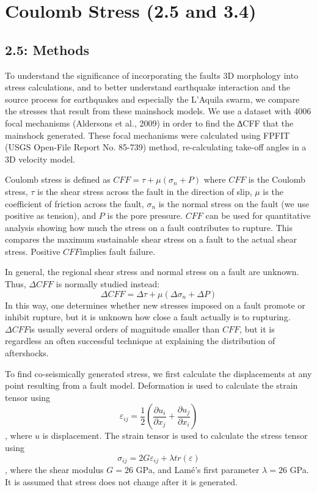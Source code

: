 \documentclass[11pt]{article}
\begin{document}
    \section{Coulomb Stress (2.5 and 3.4)}\label{coulomb-stress-2.5-and-3.4}

    \subsection{2.5: Methods}\label{methods}

    To understand the significance of incorporating the faults 3D morphology
into stress calculations, and to better understand earthquake
interaction and the source process for earthquakes and especially the
L'Aquila swarm, we compare the stresses that result from these mainshock
models. We use a dataset with 4006 focal mechanisms (Aldersons et al.,
2009) in order to find the ∆CFF that the mainshock generated. These
focal mechanisms were calculated using FPFIT (USGS Open-File Report No.
85-739) method, re-calculating take-off angles in a 3D velocity model.

Coulomb stress is defined as \(CFF=\tau+\mu \left(\sigma_n+P\right)\)
where \(CFF\) is the Coulomb stress, \(\tau\) is the shear stress across
the fault in the direction of slip, \(\mu\) is the coefficient of
friction across the fault, \(\sigma_n\) is the normal stress on the
fault (we use positive as tension), and \(P\) is the pore pressure.
\(CFF\) can be used for quantitative analysis showing how much the
stress on a fault contributes to rupture. This compares the maximum
sustainable shear stress on a fault to the actual shear stress. Positive
\(CFF\)implies fault failure.

In general, the regional shear stress and normal stress on a fault are
unknown. Thus, \(\Delta CFF\) is normally studied instead:
\[\Delta CFF = \Delta \tau + \mu \left( \Delta \sigma_n + \Delta P \right)\]
In this way, one determines whether new stresses imposed on a fault
promote or inhibit rupture, but it is unknown how close a fault actually
is to rupturing. \(\Delta CFF\)is usually several orders of magnitude
smaller than \(CFF\), but it is regardless an often successful technique
at explaining the distribution of aftershocks.

To find co-seismically generated stress, we first calculate the
displacements at any point resulting from a fault model. Deformation is
used to calculate the strain tensor using
\[\varepsilon_{ij} = \frac{1}{2}\left(   \frac{\partial u_i}{\partial x_j} + \frac{\partial u_j}{\partial x_i}  \right)\],
where \(u\) is displacement. The strain tensor is used to calculate the
stress tensor using
\[\sigma_{ij} = 2 G \varepsilon_{ij} + \lambda tr \left(\varepsilon \right)\],
where the shear modulus \(G = 26\) GPa, and Lamé's first parameter
\(\lambda = 26\) GPa. It is assumed that stress does not change after it
is generated.
\end{document}

